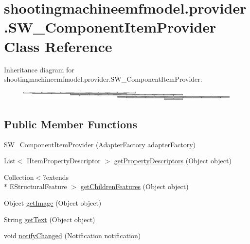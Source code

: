 \hypertarget{classshootingmachineemfmodel_1_1provider_1_1_s_w___component_item_provider}{\section{shootingmachineemfmodel.\-provider.\-S\-W\-\_\-\-Component\-Item\-Provider Class Reference}
\label{classshootingmachineemfmodel_1_1provider_1_1_s_w___component_item_provider}
}
Inheritance diagram for shootingmachineemfmodel.\-provider.\-S\-W\-\_\-\-Component\-Item\-Provider\-:\begin{figure}[H]
\begin{center}
\leavevmode
\includegraphics[height=0.531688cm]{classshootingmachineemfmodel_1_1provider_1_1_s_w___component_item_provider}
\end{center}
\end{figure}
\subsection*{Public Member Functions}
\begin{DoxyCompactItemize}
\item 
\hyperlink{classshootingmachineemfmodel_1_1provider_1_1_s_w___component_item_provider_adf956b23cf2be7dc46a67276d6fc0daf}{S\-W\-\_\-\-Component\-Item\-Provider} (Adapter\-Factory adapter\-Factory)
\item 
List$<$ I\-Item\-Property\-Descriptor $>$ \hyperlink{classshootingmachineemfmodel_1_1provider_1_1_s_w___component_item_provider_a3ef3cfe68f09dbd5e3dbdd6434c4c993}{get\-Property\-Descriptors} (Object object)
\item 
Collection$<$?extends \\*
E\-Structural\-Feature $>$ \hyperlink{classshootingmachineemfmodel_1_1provider_1_1_s_w___component_item_provider_ab9787e4ce270fa612af5fde65557deac}{get\-Children\-Features} (Object object)
\item 
Object \hyperlink{classshootingmachineemfmodel_1_1provider_1_1_s_w___component_item_provider_a510a9b2ea6467533f8091d17144409a0}{get\-Image} (Object object)
\item 
String \hyperlink{classshootingmachineemfmodel_1_1provider_1_1_s_w___component_item_provider_a41fdd3bc7318e765094590b7278d5e86}{get\-Text} (Object object)
\item 
void \hyperlink{classshootingmachineemfmodel_1_1provider_1_1_s_w___component_item_provider_a31f46d81ff89ce4047aa419a5065d920}{notify\-Changed} (Notification notification)
\end{DoxyCompactItemize}
